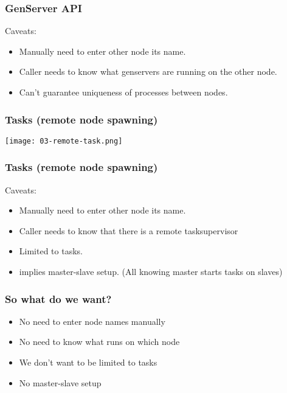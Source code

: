 \begin{frame}
    \frametitle{GenServer API}
    Caveats: 
    \begin{itemize}
        \item Manually need to enter other node its name.
        \item Caller needs to know what genservers are running on the other node.
        \item Can't guarantee uniqueness of processes between nodes.
    \end{itemize}
\end{frame}


\begin{frame}
    \frametitle{Tasks (remote node spawning)}
    \begin{center}
        \texttt{[image: 03-remote-task.png]}
    \end{center}
\end{frame}

\begin{frame}
    \frametitle{Tasks (remote node spawning)}
    Caveats: 
    \begin{itemize}
        \item Manually need to enter other node its name.
        \item Caller needs to know that there is a remote tasksupervisor
        \item Limited to tasks.
        \item implies master-slave setup. (All knowing master starts tasks on slaves)
    \end{itemize}
\end{frame}

\begin{frame}
    \frametitle{So what do we want?}
    \begin{itemize}
        \item No need to enter node names manually
        \item No need to know what runs on which node
        \item We don't want to be limited to tasks
        \item No master-slave setup
    \end{itemize}
\end{frame}

